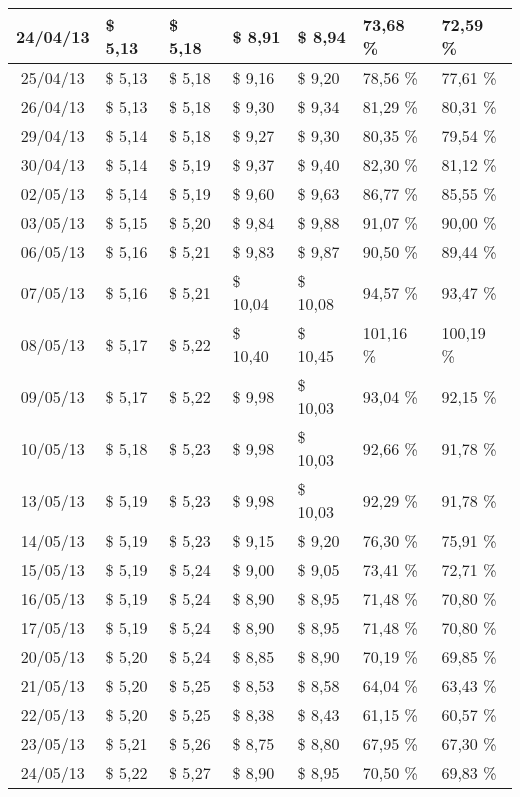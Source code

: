 \begin{center}
\begin{longtable}{|c|p{1.5cm}|p{1.5cm}|p{1.5cm}|p{1.5cm}|p{1.5cm}|p{1.5cm}|}
24/04/13 & \$ 5,13 & \$ 5,18 & \$ 8,91 & \$ 8,94 & 73,68 \% & 72,59 \% \\ \hline
25/04/13 & \$ 5,13 & \$ 5,18 & \$ 9,16 & \$ 9,20 & 78,56 \% & 77,61 \% \\ \hline
26/04/13 & \$ 5,13 & \$ 5,18 & \$ 9,30 & \$ 9,34 & 81,29 \% & 80,31 \% \\ \hline
29/04/13 & \$ 5,14 & \$ 5,18 & \$ 9,27 & \$ 9,30 & 80,35 \% & 79,54 \% \\ \hline
30/04/13 & \$ 5,14 & \$ 5,19 & \$ 9,37 & \$ 9,40 & 82,30 \% & 81,12 \% \\ \hline
02/05/13 & \$ 5,14 & \$ 5,19 & \$ 9,60 & \$ 9,63 & 86,77 \% & 85,55 \% \\ \hline
03/05/13 & \$ 5,15 & \$ 5,20 & \$ 9,84 & \$ 9,88 & 91,07 \% & 90,00 \% \\ \hline
06/05/13 & \$ 5,16 & \$ 5,21 & \$ 9,83 & \$ 9,87 & 90,50 \% & 89,44 \% \\ \hline
07/05/13 & \$ 5,16 & \$ 5,21 & \$ 10,04 & \$ 10,08 & 94,57 \% & 93,47 \% \\ \hline
08/05/13 & \$ 5,17 & \$ 5,22 & \$ 10,40 & \$ 10,45 & 101,16 \% & 100,19 \% \\ \hline
09/05/13 & \$ 5,17 & \$ 5,22 & \$ 9,98 & \$ 10,03 & 93,04 \% & 92,15 \% \\ \hline
10/05/13 & \$ 5,18 & \$ 5,23 & \$ 9,98 & \$ 10,03 & 92,66 \% & 91,78 \% \\ \hline
13/05/13 & \$ 5,19 & \$ 5,23 & \$ 9,98 & \$ 10,03 & 92,29 \% & 91,78 \% \\ \hline
14/05/13 & \$ 5,19 & \$ 5,23 & \$ 9,15 & \$ 9,20 & 76,30 \% & 75,91 \% \\ \hline
15/05/13 & \$ 5,19 & \$ 5,24 & \$ 9,00 & \$ 9,05 & 73,41 \% & 72,71 \% \\ \hline
16/05/13 & \$ 5,19 & \$ 5,24 & \$ 8,90 & \$ 8,95 & 71,48 \% & 70,80 \% \\ \hline
17/05/13 & \$ 5,19 & \$ 5,24 & \$ 8,90 & \$ 8,95 & 71,48 \% & 70,80 \% \\ \hline
20/05/13 & \$ 5,20 & \$ 5,24 & \$ 8,85 & \$ 8,90 & 70,19 \% & 69,85 \% \\ \hline
21/05/13 & \$ 5,20 & \$ 5,25 & \$ 8,53 & \$ 8,58 & 64,04 \% & 63,43 \% \\ \hline
22/05/13 & \$ 5,20 & \$ 5,25 & \$ 8,38 & \$ 8,43 & 61,15 \% & 60,57 \% \\ \hline
23/05/13 & \$ 5,21 & \$ 5,26 & \$ 8,75 & \$ 8,80 & 67,95 \% & 67,30 \% \\ \hline
24/05/13 & \$ 5,22 & \$ 5,27 & \$ 8,90 & \$ 8,95 & 70,50 \% & 69,83 \% \\ \hline

\end{longtable}
\end{center}
